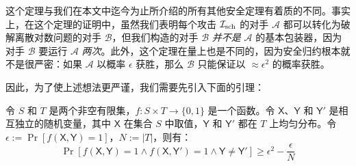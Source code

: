 这个定理与我们在本文中迄今为止所介绍的所有其他安全定理有着质的不同。事实上，在这个定理的证明中，虽然我们表明每个攻击 $\mathcal{I}_{\rm sch}$ 的对手 $\mathcal{A}$ 都可以转化为破解离散对数问题的对手 $\mathcal{B}$，但我们构造的对手 $\mathcal{B}$ \emph{并不是} $\mathcal{A}$ 的基本包装器，因为对手 $\mathcal{B}$ 要运行 $\mathcal{A}$ \emph{两次}。此外，这个定理在量上也是不同的，因为安全归约根本就不是很严密：如果 $\mathcal{A}$ 以概率 $\epsilon$ 获胜，那么 $\mathcal{B}$ 只能保证以 $\approx\epsilon^2$ 的概率获胜。

因此，为了使上述想法更严谨，我们需要先引入下面的引理：

\begin{lemma}[回溯引理]\label{theo:19-2}
	令 $S$ 和 $T$ 是两个非空有限集，$f:S\times T\to\{0,1\}$ 是一个函数。令 $\mathsf{X}$、$\mathsf{Y}$ 和 $\mathsf{Y}'$ 是相互独立的随机变量，其中 $\mathsf{X}$ 在集合 $S$ 中取值，$\mathsf{Y}$ 和 $\mathsf{Y}'$ 都在 $T$ 上均匀分布。令 $\epsilon:=\Pr[f(\mathsf{X},\mathsf{Y})=1]$，$N:=|T|$，则有：
	$$\Pr[f(\mathsf{X},\mathsf{Y})=1\land f(\mathsf{X},\mathsf{Y}')=1\land \mathsf{Y}\neq\mathsf{Y}']\geq\epsilon^2-\frac{\epsilon}{N}$$
\end{lemma}

